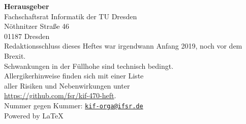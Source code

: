 \newpage
\thispagestyle{empty} %

\begin{minipage}[t][\textheight][b]{.60\textwidth}
\footnotesize
\textbf{Herausgeber} \\
Fachschaftsrat Informatik der TU Dresden\\
Nöthnitzer Straße 46\\
01187 Dresden\\[1\baselineskip]


Redaktionsschluss dieses Heftes war irgendwann Anfang 2019, noch vor dem Brexit.\\%
Schwankungen in der Füllhohe sind technisch bedingt.\\[1\baselineskip]

Allergikerhinweise finden sich mit einer Liste\\
aller Risiken und Nebenwirkungen unter\\
\url{https://github.com/fsr/kif-470-heft}.\\[1\baselineskip]

Nummer gegen Kummer: \href{mailto:kif-orga@ifsr.de}{\texttt{kif-orga@ifsr.de}}\\[1\baselineskip]

Powered by \LaTeX
\end{minipage}%
\hspace{.18\textwidth}%
